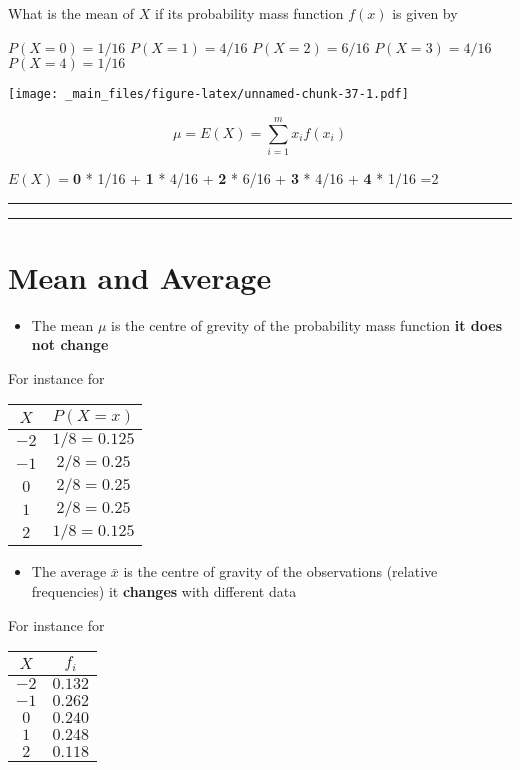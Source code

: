 \documentclass[
]{book}
\providecommand{\tightlist}{%
  \setlength{\itemsep}{0pt}\setlength{\parskip}{0pt}}
\begin{document}
What is the mean of \(X\) if its probability mass function \(f(x)\) is given by

\(P(X=0)=1/16\)
\(P(X=1)=4/16\)
\(P(X=2)=6/16\)
\(P(X=3)=4/16\)
\(P(X=4)=1/16\)

\texttt{[image: \_main\_files/figure-latex/unnamed-chunk-37-1.pdf]}

\[ \mu =E(X)=\sum_{i=1}^m x_i f(x_i) \]

\(E(X)=\)\textbf{0} * 1/16 + \textbf{1} * 4/16 + \textbf{2} * 6/16 + \textbf{3} * 4/16 + \textbf{4} * 1/16 =2

\begin{center}\rule{0.5\linewidth}{0.5pt}\end{center}

\begin{center}\rule{0.5\linewidth}{0.5pt}\end{center}

\hypertarget{mean-and-average}{%
\section{Mean and Average}\label{mean-and-average}}

\begin{itemize}
\tightlist
\item
  The mean \(\mu\) is the centre of grevity of the probability mass function \textbf{it does not change}
\end{itemize}

For instance for

\begin{longtable}[]{@{}cc@{}}
\toprule
\(X\) & \(P(X=x)\) \\
\midrule
\endhead
\(-2\) & \(1/8=0.125\) \\
\(-1\) & \(2/8=0.25\) \\
\(0\) & \(2/8=0.25\) \\
\(1\) & \(2/8=0.25\) \\
\(2\) & \(1/8=0.125\) \\
\bottomrule
\end{longtable}

\begin{itemize}
\tightlist
\item
  The average \(\bar{x}\) is the centre of gravity of the observations (relative frequencies) it \textbf{changes} with different data
\end{itemize}

For instance for

\begin{longtable}[]{@{}cc@{}}
\toprule
\(X\) & \(f_i\) \\
\midrule
\endhead
\(-2\) & \(0.132\) \\
\(-1\) & \(0.262\) \\
\(0\) & \(0.240\) \\
\(1\) & \(0.248\) \\
\(2\) & \(0.118\) \\
\bottomrule
\end{longtable}
\end{document}
